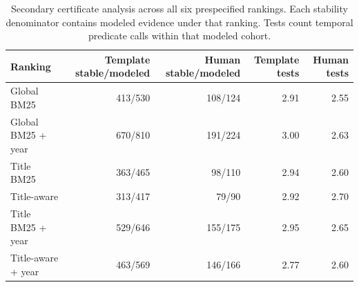 \begin{table}[t]
\centering\small
\begin{tabular}{lrrrr}
\toprule
Ranking & Template stable/modeled & Human stable/modeled & Template tests & Human tests \\
\midrule
Global BM25 & 413/530 & 108/124 & 2.91 & 2.55 \\
Global BM25 + year & 670/810 & 191/224 & 3.00 & 2.63 \\
Title BM25 & 363/465 & 98/110 & 2.94 & 2.60 \\
Title-aware & 313/417 & 79/90 & 2.92 & 2.70 \\
Title BM25 + year & 529/646 & 155/175 & 2.95 & 2.65 \\
Title-aware + year & 463/569 & 146/166 & 2.77 & 2.60 \\
\bottomrule
\end{tabular}
\caption{Secondary certificate analysis across all six prespecified rankings. Each stability denominator contains modeled evidence under that ranking. Tests count temporal predicate calls within that modeled cohort.}
\label{tab:ranking-portability}
\end{table}
